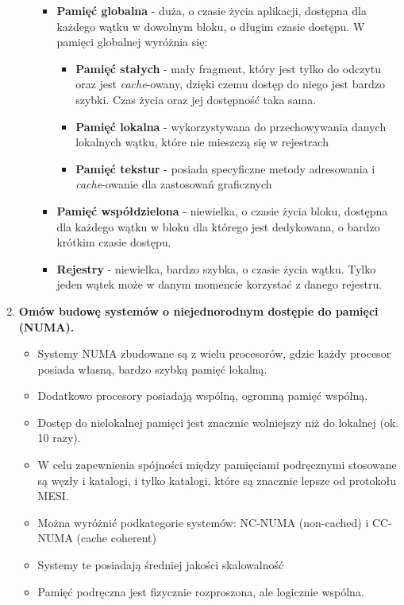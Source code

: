 \begin{enumerate}
\begin{samepage}
\begin{itemize}
\begin{itemize}
						\item \textbf{Pamięć globalna} - duża, o czasie życia aplikacji, dostępna dla każdego wątku w dowolnym bloku, o długim czasie dostępu. W pamięci globalnej wyróżnia się:
						\begin{itemize}
							\item \textbf{Pamięć stałych} - mały fragment, który jest tylko do odczytu oraz jest \textit{cache}-owany, dzięki czemu dostęp do niego jest bardzo szybki. Czas życia oraz jej dostępność taka sama.
							\item \textbf{Pamięć lokalna} - wykorzystywana do przechowywania danych lokalnych wątku, które nie mieszczą się w rejestrach
							\item \textbf{Pamięć tekstur} - posiada specyficzne metody adresowania i \textit{cache}-owanie dla zastosowań graficznych
						\end{itemize}
						\item \textbf{Pamięć współdzielona} - niewielka, o czasie życia bloku, dostępna dla każdego wątku w bloku dla którego jest dedykowana, o bardzo krótkim czasie dostępu.
						\item \textbf{Rejestry}	- niewielka, bardzo szybka, o czasie życia wątku. Tylko jeden wątek może w danym momencie korzystać z danego rejestru.
					\end{itemize}
				\end{itemize}
			\end{samepage}
			\item \textbf{Omów budowę systemów o niejednorodnym dostępie do pamięci (NUMA).}
			\begin{samepage}
			\begin{itemize}
				\item Systemy NUMA zbudowane są z wielu procesorów, gdzie każdy procesor posiada własną, bardzo szybką pamięć lokalną.
				\item Dodatkowo procesory posiadają wspólną, ogromną pamięć wspólną.
				\item Dostęp do nielokalnej pamięci jest znacznie wolniejszy niż do lokalnej (ok. 10 razy).
				\item W celu zapewnienia spójności między pamięciami podręcznymi stosowane są węzły i katalogi, i tylko katalogi, które są znacznie lepsze od protokołu MESI.
				\item Można wyróżnić podkategorie systemów: NC-NUMA (non-cached) i CC-NUMA (cache coherent)
				\item Systemy te posiadają średniej jakości skalowalność
				\item Pamięć podręczna jest fizycznie rozproszona, ale logicznie wspólna.

\end{itemize}
\end{samepage}
\end{enumerate}
